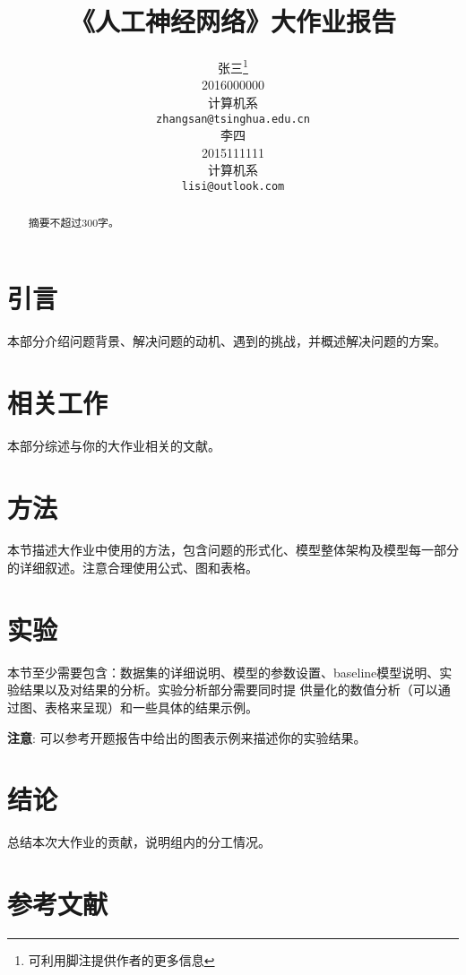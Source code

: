\documentclass{article}
\title{《人工神经网络》大作业报告}
\author{%
  张三\thanks{可利用脚注提供作者的更多信息} \\
  2016000000 \\
  计算机系 \\
  \texttt{zhangsan@tsinghua.edu.cn} \\
  \And
  李四\\
  2015111111 \\
  计算机系 \\
  \texttt{lisi@outlook.com} \\
}
\begin{document}
\begin{CJK*}{UTF8}{gbsn}
\maketitle

\begin{abstract}
    摘要不超过300字。
\end{abstract}


\section{引言}

本部分介绍问题背景、解决问题的动机、遇到的挑战，并概述解决问题的方案。

\section{相关工作}

本部分综述与你的大作业相关的文献。

\section{方法}

本节描述大作业中使用的方法，包含问题的形式化、模型整体架构及模型每一部分的详细叙述。注意合理使用公式、图和表格。

\section{实验}

本节至少需要包含：数据集的详细说明、模型的参数设置、baseline模型说明、实验结果以及对结果的分析。实验分析部分需要同时提
供量化的数值分析（可以通过图、表格来呈现）和一些具体的结果示例。

\textbf{注意}: 可以参考开题报告中给出的图表示例来描述你的实验结果。


\section{结论}

总结本次大作业的贡献，说明组内的分工情况。


\section*{参考文献}

\small


\end{CJK*}
\end{document}
